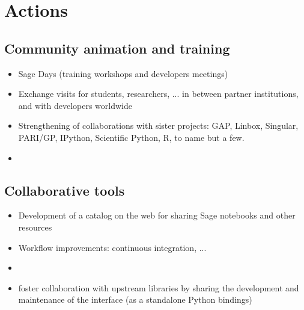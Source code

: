 \section{Actions}


\subsection{Community animation and training}

\begin{itemize}
\item Sage Days (training workshops and developers meetings)
\item Exchange visits for students, researchers, ... in between
  partner institutions, and with developers worldwide
\item Strengthening of collaborations with sister projects: GAP,
  Linbox, Singular, PARI/GP, IPython, Scientific Python, R, to name but a
  few.
\item {}
\end{itemize}

\subsection{Collaborative tools}

\begin{itemize}
\item Development of a catalog on the web for sharing Sage notebooks
  and other resources 
\item Workflow improvements: continuous integration, ...
\item {}
\item foster collaboration with upstream libraries by sharing the development
  and maintenance of the interface (as a standalone Python bindings)
\end{itemize}


